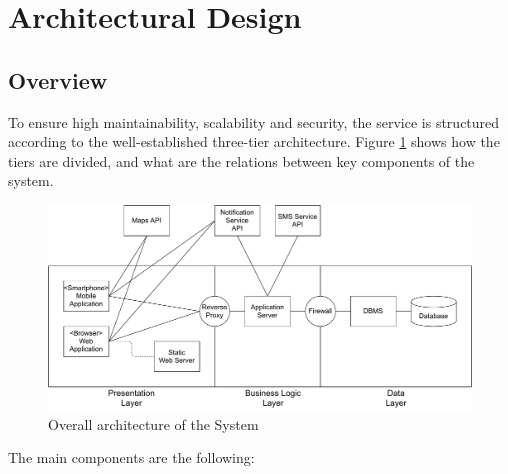 
\section{Architectural Design}

\subsection{Overview}
To ensure high maintainability, scalability and security, the service is structured according to the well-established three-tier architecture.
Figure \ref{fig:overview-architecture} shows how the tiers are divided, and what are the relations between key components of the system.

\begin{figure}[h]
    \includegraphics[width=\linewidth]{images/draw.io/overview_architecture.pdf}
    \caption{Overall architecture of the System}
    \label{fig:overview-architecture}
\end{figure}

The main components are the following:

